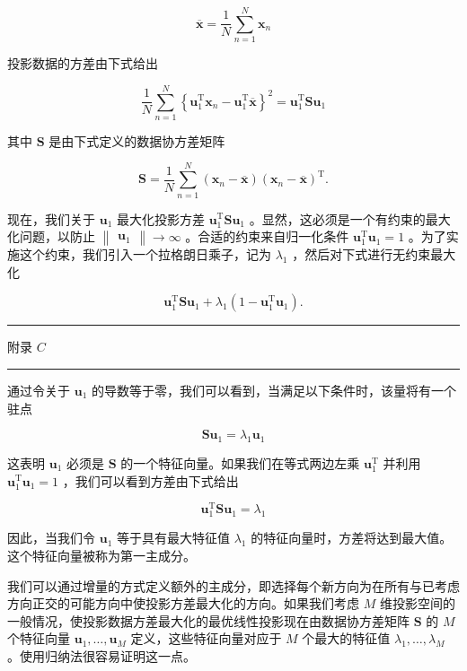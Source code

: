 \documentclass[10pt]{report}
\newcommand{\HRule}{\begin{center}\rule{0.9\linewidth}{0.2mm}\end{center}}
\begin{document}
\[
\overline{\mathbf{x}} = \frac{1}{N}\mathop{\sum }\limits_{{n = 1}}^{N}{\mathbf{x}}_{n} \tag{16.1}
\]

投影数据的方差由下式给出

\[
\frac{1}{N}\mathop{\sum }\limits_{{n = 1}}^{N}{\left\{  {\mathbf{u}}_{1}^{\mathrm{T}}{\mathbf{x}}_{n} - {\mathbf{u}}_{1}^{\mathrm{T}}\overline{\mathbf{x}}\right\}  }^{2} = {\mathbf{u}}_{1}^{\mathrm{T}}\mathbf{S}{\mathbf{u}}_{1} \tag{16.2}
\]

其中 \(\mathbf{S}\) 是由下式定义的数据协方差矩阵

\[
\mathbf{S} = \frac{1}{N}\mathop{\sum }\limits_{{n = 1}}^{N}\left( {{\mathbf{x}}_{n} - \overline{\mathbf{x}}}\right) {\left( {\mathbf{x}}_{n} - \overline{\mathbf{x}}\right) }^{\mathrm{T}}. \tag{16.3}
\]

现在，我们关于 \({\mathbf{u}}_{1}\) 最大化投影方差 \({\mathbf{u}}_{1}^{\mathrm{T}}\mathbf{S}{\mathbf{u}}_{1}\) 。显然，这必须是一个有约束的最大化问题，以防止 \(\begin{Vmatrix}{\mathbf{u}}_{1}\end{Vmatrix} \rightarrow  \infty\) 。合适的约束来自归一化条件 \({\mathbf{u}}_{1}^{\mathrm{T}}{\mathbf{u}}_{1} = 1\) 。为了实施这个约束，我们引入一个拉格朗日乘子，记为 \({\lambda }_{1}\) ，然后对下式进行无约束最大化

\[
{\mathbf{u}}_{1}^{\mathrm{T}}\mathbf{S}{\mathbf{u}}_{1} + {\lambda }_{1}\left( {1 - {\mathbf{u}}_{1}^{\mathrm{T}}{\mathbf{u}}_{1}}\right) . \tag{16.4}
\]

\HRule

附录 \(C\)

\HRule

通过令关于 \({\mathbf{u}}_{1}\) 的导数等于零，我们可以看到，当满足以下条件时，该量将有一个驻点

\[
\mathbf{S}{\mathbf{u}}_{1} = {\lambda }_{1}{\mathbf{u}}_{1} \tag{16.5}
\]

这表明 \({\mathbf{u}}_{1}\) 必须是 \(\mathbf{S}\) 的一个特征向量。如果我们在等式两边左乘 \({\mathbf{u}}_{1}^{\mathrm{T}}\) 并利用 \({\mathbf{u}}_{1}^{\mathrm{T}}{\mathbf{u}}_{1} = 1\) ，我们可以看到方差由下式给出

\[
{\mathbf{u}}_{1}^{\mathrm{T}}\mathbf{S}{\mathbf{u}}_{1} = {\lambda }_{1} \tag{16.6}
\]

因此，当我们令 \({\mathbf{u}}_{1}\) 等于具有最大特征值 \({\lambda }_{1}\) 的特征向量时，方差将达到最大值。这个特征向量被称为第一主成分。

我们可以通过增量的方式定义额外的主成分，即选择每个新方向为在所有与已考虑方向正交的可能方向中使投影方差最大化的方向。如果我们考虑 \(M\) 维投影空间的一般情况，使投影数据方差最大化的最优线性投影现在由数据协方差矩阵 \(\mathbf{S}\) 的 \(M\) 个特征向量 \({\mathbf{u}}_{1},\ldots ,{\mathbf{u}}_{M}\) 定义，这些特征向量对应于 \(M\) 个最大的特征值 \({\lambda }_{1},\ldots ,{\lambda }_{M}\) 。使用归纳法很容易证明这一点。
\end{document}

